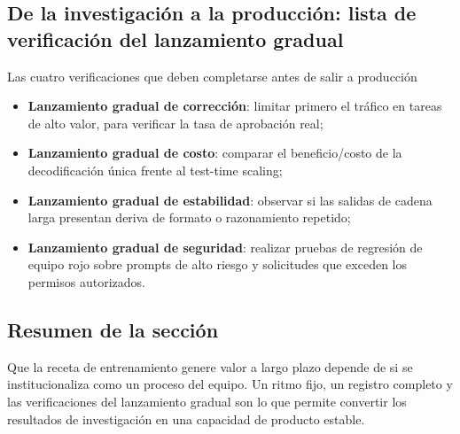 \subsection{De la investigación a la producción: lista de verificación del lanzamiento gradual}
\begin{warningbox}{Las cuatro verificaciones que deben completarse antes de salir a producción}
\begin{itemize}
    \item \textbf{Lanzamiento gradual de corrección}: limitar primero el tráfico en tareas de alto valor, para verificar la tasa de aprobación real;
    \item \textbf{Lanzamiento gradual de costo}: comparar el beneficio/costo de la decodificación única frente al test-time scaling;
    \item \textbf{Lanzamiento gradual de estabilidad}: observar si las salidas de cadena larga presentan deriva de formato o razonamiento repetido;
    \item \textbf{Lanzamiento gradual de seguridad}: realizar pruebas de regresión de equipo rojo sobre prompts de alto riesgo y solicitudes que exceden los permisos autorizados.
\end{itemize}
\end{warningbox}

\subsection{Resumen de la sección}
Que la receta de entrenamiento genere valor a largo plazo depende de si se institucionaliza como un proceso del equipo. Un ritmo fijo, un registro completo y las verificaciones del lanzamiento gradual son lo que permite convertir los resultados de investigación en una capacidad de producto estable.

